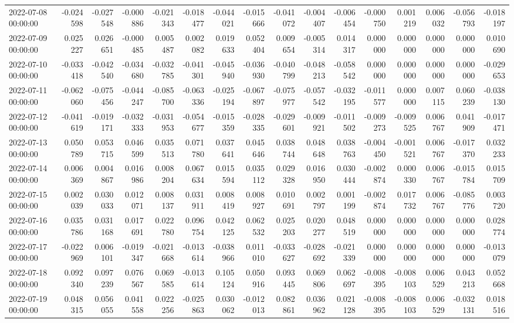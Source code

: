 \begin{tabular}{lrrrrrrrrrrrrrrr}
2022-07-08 00:00:00 & -0.024598 & -0.027548 & -0.000886 & -0.021343 & -0.018477 & -0.044021 & -0.015666 & -0.041072 & -0.004407 & -0.006454 & -0.000750 & 0.001219 & 0.006032 & -0.056793 & -0.018197 \\
2022-07-09 00:00:00 & 0.025227 & 0.026651 & -0.000485 & 0.005487 & 0.002082 & 0.019633 & 0.052404 & 0.009654 & -0.005314 & 0.014317 & 0.000000 & 0.000000 & 0.000000 & 0.000000 & 0.010690 \\
2022-07-10 00:00:00 & -0.033418 & -0.042540 & -0.034680 & -0.032785 & -0.041301 & -0.045940 & -0.036930 & -0.040799 & -0.048213 & -0.058542 & 0.000000 & 0.000000 & 0.000000 & 0.000000 & -0.029653 \\
2022-07-11 00:00:00 & -0.062060 & -0.075456 & -0.044247 & -0.085700 & -0.063336 & -0.025194 & -0.067897 & -0.075977 & -0.057542 & -0.032195 & -0.011577 & 0.000000 & 0.007115 & 0.060239 & -0.038130 \\
2022-07-12 00:00:00 & -0.041619 & -0.019171 & -0.032333 & -0.031953 & -0.054677 & -0.015359 & -0.028335 & -0.029601 & -0.009921 & -0.011502 & -0.009273 & -0.009525 & 0.006767 & 0.041909 & -0.017471 \\
2022-07-13 00:00:00 & 0.050789 & 0.053715 & 0.046599 & 0.035513 & 0.071780 & 0.037641 & 0.045646 & 0.038744 & 0.048648 & 0.038763 & -0.004450 & -0.001521 & 0.006767 & -0.017370 & 0.032233 \\
2022-07-14 00:00:00 & 0.006369 & 0.004867 & 0.016986 & 0.008204 & 0.067634 & 0.015594 & 0.035112 & 0.029328 & 0.016950 & 0.030444 & -0.002874 & 0.000330 & 0.006767 & -0.015784 & 0.015709 \\
2022-07-15 00:00:00 & 0.002039 & 0.030033 & 0.012071 & 0.008137 & 0.031911 & 0.008419 & 0.008927 & 0.010691 & 0.002797 & 0.001199 & -0.002874 & 0.017732 & 0.006767 & -0.085776 & 0.003720 \\
2022-07-16 00:00:00 & 0.035786 & 0.031168 & 0.017691 & 0.022780 & 0.096754 & 0.042125 & 0.062532 & 0.025203 & 0.020277 & 0.048519 & 0.000000 & 0.000000 & 0.000000 & 0.000000 & 0.028774 \\
2022-07-17 00:00:00 & -0.022969 & 0.006101 & -0.019347 & -0.021668 & -0.013614 & -0.038966 & 0.011010 & -0.033627 & -0.028692 & -0.021339 & 0.000000 & 0.000000 & 0.000000 & 0.000000 & -0.013079 \\
2022-07-18 00:00:00 & 0.092340 & 0.097239 & 0.076567 & 0.069585 & -0.013614 & 0.105124 & 0.050916 & 0.093445 & 0.069806 & 0.062697 & -0.008395 & -0.008103 & 0.006529 & 0.043213 & 0.052668 \\
2022-07-19 00:00:00 & 0.048315 & 0.056055 & 0.041558 & 0.022256 & -0.025863 & 0.030062 & -0.012013 & 0.082861 & 0.036962 & 0.021128 & -0.008395 & -0.008103 & 0.006529 & -0.032131 & 0.018516 \\

\end{tabular}
